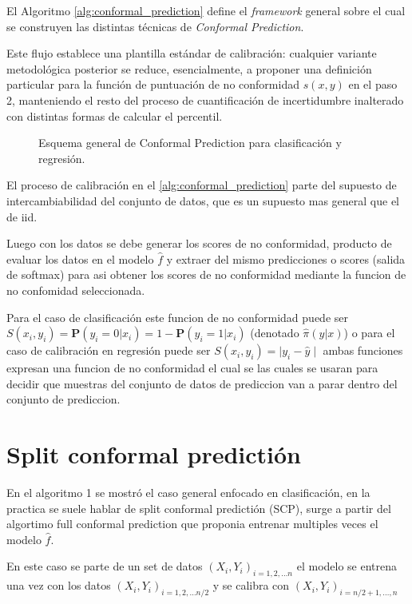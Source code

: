 El Algoritmo \ref{alg:conformal_prediction} define el \textit{framework} general sobre el cual se construyen las distintas técnicas de \textit{Conformal Prediction}.

Este flujo establece una plantilla estándar de calibración: cualquier variante metodológica posterior se reduce, esencialmente, a proponer una definición particular para la función de puntuación de no conformidad $s(x,y)$ en el paso 2, manteniendo el resto del proceso de cuantificación de incertidumbre inalterado con distintas formas de calcular el percentil.

\begin{figure}[H]
    \centering
    \resizebox{1.04\textwidth}{!}{%
        
    }
    \caption{Esquema general de Conformal Prediction para clasificación y regresión.}
    \label{fig:conformal_prediction}
\end{figure}

El proceso de calibración en el \ref{alg:conformal_prediction} parte del supuesto de intercambiabilidad del conjunto de datos, que es un supuesto mas general que el de iid.

Luego con los datos se debe generar los scores de no conformidad, producto de evaluar los datos en el modelo $\hat{f}$ y extraer del mismo predicciones o scores (salida de softmax) para asi obtener los  scores de no conformidad mediante la funcion de no confomidad seleccionada.

Para el caso de clasificación este funcion de no conformidad puede ser $S(x_i,y_i) = \mathbf{P}(y_i=0  | x_i) = 1 - \mathbf{P}(y_i=1 | x_i)$ (denotado $\hat{\pi}(y|x)$) o para el caso de calibración en regresión puede ser $S(x_i,y_i) = \mid y_i - \hat{y} \mid$ ambas funciones expresan una funcion de no conformidad el cual se las cuales se usaran para decidir que muestras del conjunto de datos de prediccion van a parar dentro del conjunto de prediccion.

\section{Split conformal predictión}

En el algoritmo 1 se mostró el caso general enfocado en clasificación, en la practica se suele hablar de split conformal predictión (SCP), surge a partir del algortimo full conformal prediction que proponia entrenar multiples veces el modelo $\hat{f}$.

En este caso se parte de un set de datos $(X_i, Y_i)_{i=1,2, \dots n}$ el modelo se entrena una vez con los datos $(X_i, Y_i)_{i=1,2, \dots n/2}$ y se calibra con $(X_i,Y_i)_{i=n/2 + 1, \dots , n}$

